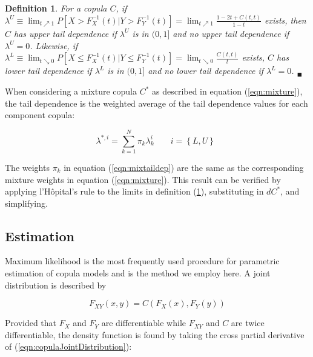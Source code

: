\documentclass[12pt]{article}
\newtheorem{defn}{Definition}
\begin{document}
\begin{defn} \label{defn:tail_dep}
	For a copula $C$, if $\lambda^{U}\equiv\lim_{t\nearrow 1}P\left[X > F_{X}^{-1}\left(t\right) | Y > F_{Y}^{-1}\left(t\right)\right] = \lim_{t\nearrow 1}\frac{1-2t+C\left(t,t\right)}{1-t}$ exists, then $C$ has upper tail dependence if $\lambda^{U}$ is in $(0,1]$ and no upper tail dependence if $\lambda^{U}=0$. Likewise, if $\lambda ^{L}\equiv \lim_{t\searrow 0}P\left[X\leq F_{X}^{-1}\left(t\right) | Y\leq F_{Y}^{-1}\left(t\right)\right] =\lim_{t\searrow 0}\frac{C\left(t,t\right)}{t}$ exists, $C$ has lower tail dependence if $\lambda ^{L}$ is in $(0,1]$ and no lower tail dependence if $\lambda^{L} = 0$. $_{\blacksquare}$
\end{defn}

When considering a mixture copula $C^{\ast}$ as described in equation (\ref{eqn:mixture}), the tail dependence is the weighted average of the tail dependence values for each component copula:

\begin{equation} \label{eqn:mixtaildep}
\lambda^{\ast, i} = \sum_{k=1}^{N}\pi _{k}\lambda_{k}^{i}
\begin{array}{c}
~~~~~~~i = \left\{L,U\right\} 
\end{array}
\end{equation}

The weights $\pi_{k}$ in equation (\ref{eqn:mixtaildep}) are the same as the corresponding mixture weights in equation (\ref{eqn:mixture}). This result can be verified by applying l'H\^{o}pital's rule to the limits in definition (\ref{defn:tail_dep}), substituting in $dC^{\ast}$, and simplifying.

 \subsection{Estimation}

Maximum likelihood is the most frequently used procedure for parametric estimation of copula models and is the method we employ here. A joint distribution is described by

\begin{equation} \label{eqn:copulaJointDistribution}
	F_{XY}\left(x,y\right) = C\left(F_{X}\left(x\right), F_{Y}\left(y\right)\right)
\end{equation}

Provided that $F_{X}$ and $F_{Y}$ are differentiable while $F_{XY}$ and $C$ are twice differentiable, the density function is found by taking the cross partial derivative of (\ref{eqn:copulaJointDistribution}):
\end{document}
